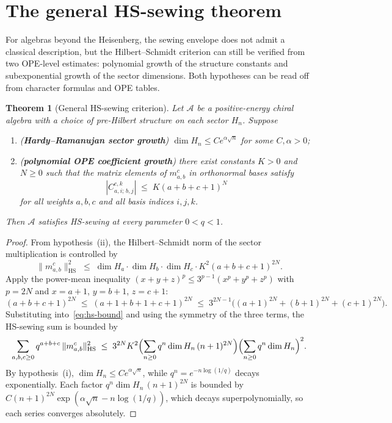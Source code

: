 \documentclass[11pt,reqno]{amsart}
\newtheorem{theorem}{Theorem}[section]
\theoremstyle{definition}
\theoremstyle{remark}
\newcommand{\cA}{\mathcal{A}}
\newcommand{\HS}{\mathrm{HS}}
\numberwithin{equation}{section}
\begin{document}
\section{The general HS-sewing theorem}\label{sec:general-criterion}

For algebras beyond the Heisenberg, the sewing envelope does not
admit a classical description, but the Hilbert--Schmidt criterion
can still be verified from two OPE-level estimates: polynomial
growth of the structure constants and subexponential growth of
the sector dimensions. Both hypotheses can be read off from
character formulas and OPE tables.

\begin{theorem}[General HS-sewing criterion]
\label{thm:general-hs-sewing}
Let $\cA$ be a positive-energy chiral algebra with a choice of
pre-Hilbert structure on each sector $H_n$. Suppose
\begin{enumerate}[label=\textup{(\roman*)}]
\item (\textbf{Hardy--Ramanujan sector growth})
$\dim H_n \leq C e^{\alpha\sqrt{n}}$ for some
$C, \alpha > 0$;
\item (\textbf{polynomial OPE coefficient growth}) there exist
constants $K > 0$ and $N \geq 0$ such that the matrix elements
of $m_{a,b}^c$ in orthonormal bases satisfy
\[
|C^{c,k}_{a,i;\,b,j}| \;\leq\; K(a + b + c + 1)^N
\]
for all weights $a, b, c$ and all basis indices $i, j, k$.
\end{enumerate}
Then $\cA$ satisfies HS-sewing at every parameter
$0 < q < 1$.
\end{theorem}

\begin{proof}
From hypothesis~(ii), the Hilbert--Schmidt norm of the sector
multiplication is controlled by
\begin{equation}\label{eq:hs-bound}
\|m_{a,b}^c\|_{\HS}^2
\;\leq\;
\dim H_a \cdot \dim H_b \cdot \dim H_c \cdot
K^2 (a + b + c + 1)^{2N}.
\end{equation}
Apply the power-mean inequality
$(x + y + z)^p \leq 3^{p-1}(x^p + y^p + z^p)$ with $p = 2N$ and
$x = a+1$, $y = b+1$, $z = c+1$:
\[
(a + b + c + 1)^{2N}
\;\leq\;
(a+1+b+1+c+1)^{2N}
\;\leq\;
3^{2N-1}\bigl((a+1)^{2N} + (b+1)^{2N} + (c+1)^{2N}\bigr).
\]
Substituting into~\eqref{eq:hs-bound} and using the symmetry of
the three terms, the HS-sewing sum is bounded by
\[
\sum_{a, b, c \geq 0}
q^{a+b+c}\, \|m_{a,b}^c\|_{\HS}^2
\;\leq\;
3^{2N} K^2
\Bigl(\sum_{n \geq 0} q^n\dim H_n\,(n+1)^{2N}\Bigr)
\Bigl(\sum_{n \geq 0} q^n \dim H_n\Bigr)^2.
\]
By hypothesis~(i), $\dim H_n \leq C e^{\alpha\sqrt{n}}$, while
$q^n = e^{-n\log(1/q)}$ decays exponentially. Each factor
$q^n\dim H_n\,(n+1)^{2N}$ is bounded by
$C(n+1)^{2N}\exp(\alpha\sqrt n - n\log(1/q))$, which decays
superpolynomially, so each series converges absolutely.
\end{proof}
\end{document}
